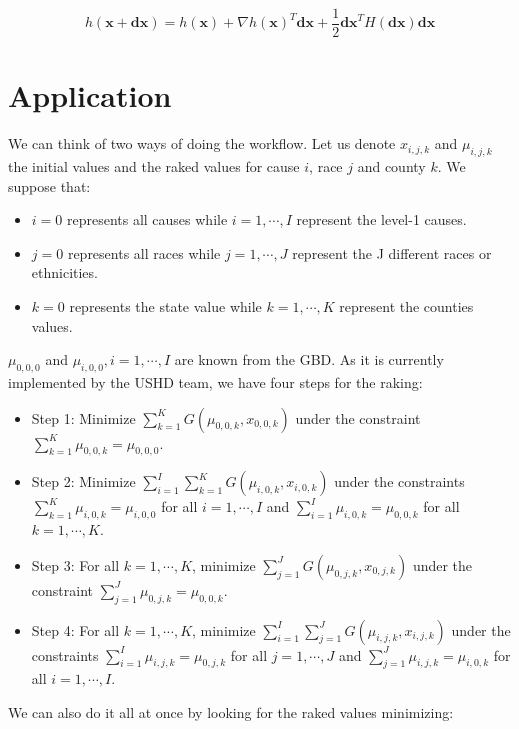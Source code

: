 \documentclass{tex/note}
\begin{document}
\begin{equation*}
h \left( \bm{x} + \bm{dx} \right) = h \left( \bm{x} \right) + \nabla h \left( \bm{x} \right) ^T \bm{dx} + \frac{1}{2} \bm{dx} ^T H \left( \bm{dx} \right) \bm{dx}
\end{equation*}

\section{Application}

We can think of two ways of doing the workflow. Let us denote $x_{i,j,k}$ and $\mu_{i,j,k}$ the initial values and the raked values for cause $i$, race $j$ and county $k$. We suppose that:
\begin{itemize}
    \item $i = 0$ represents all causes while $i = 1 , \cdots , I$ represent the level-1 causes.
    \item $j = 0$ represents all races while $j = 1 , \cdots , J$ represent the J different races or ethnicities.
    \item $k = 0$ represents the state value while $k = 1 , \cdots , K$ represent the counties values.
\end{itemize}

$\mu_{0,0,0}$ and $\mu_{i,0,0}, i = 1 , \cdots , I$ are known from the GBD. As it is currently implemented by the USHD team, we have four steps for the raking:

\begin{itemize}
    \item Step 1: Minimize $\sum_{k = 1}^K G \left( \mu_{0,0,k} , x_{0,0,k} \right)$ under the constraint $\sum_{k = 1}^K \mu_{0,0,k} = \mu_{0,0,0}$.
    \item Step 2: Minimize $\sum_{i = 1}^I \sum_{k = 1}^K G \left( \mu_{i,0,k} , x_{i,0,k} \right)$ under the constraints $\sum_{k = 1}^K \mu_{i,0,k} = \mu_{i,0,0}$ for all $i = 1 , \cdots , I$ and $\sum_{i = 1}^I \mu_{i,0,k} = \mu_{0,0,k}$ for all $k = 1, \cdots , K$.
    \item Step 3: For all $k = 1 , \cdots , K$, minimize $\sum_{j = 1}^J G \left( \mu_{0,j,k} , x_{0,j,k} \right)$ under the constraint $\sum_{j = 1}^J \mu_{0,j,k} = \mu_{0,0,k}$.
    \item Step 4: For all $k = 1 , \cdots , K$, minimize $\sum_{i = 1}^I \sum_{j = 1}^J G \left( \mu_{i,j,k} , x_{i,j,k} \right)$ under the constraints $\sum_{i = 1}^I \mu_{i,j,k} = \mu_{0,j,k}$ for all $j = 1 , \cdots , J$ and $\sum_{j = 1}^J \mu_{i,j,k} = \mu_{i,0,k}$ for all $i = 1 , \cdots , I$.
\end{itemize}
We can also do it all at once by looking for the raked values minimizing:
\end{document}
